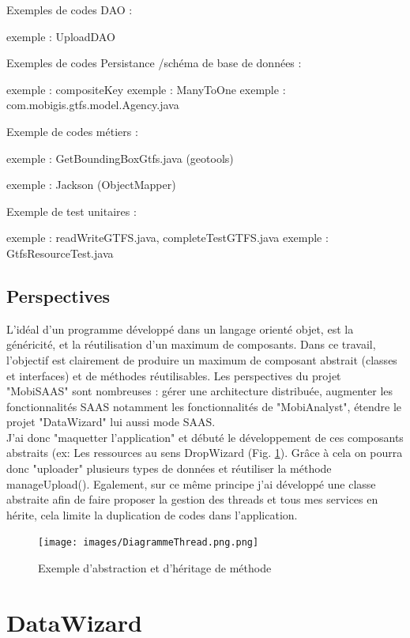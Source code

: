 \begin{itemize}
Exemples de codes DAO :

exemple : UploadDAO

Exemples de codes Persistance /schéma de base de données : 

exemple : compositeKey
exemple : ManyToOne
exemple : com.mobigis.gtfs.model.Agency.java


Exemple de codes métiers :

exemple : GetBoundingBoxGtfs.java (geotools)

exemple : Jackson (ObjectMapper)


Exemple de test unitaires :

exemple : readWriteGTFS.java, completeTestGTFS.java
exemple : GtfsResourceTest.java

\subsection{Perspectives}

L'idéal d'un programme développé dans un langage orienté objet, est la généricité, et la réutilisation d'un maximum de composants. Dans ce travail, l'objectif est clairement de produire un maximum de composant abstrait (classes et interfaces) et de méthodes réutilisables. Les perspectives du projet "MobiSAAS" sont nombreuses : gérer une architecture distribuée, augmenter les fonctionnalités SAAS notamment les fonctionnalités de "MobiAnalyst", étendre le projet "DataWizard" lui aussi mode SAAS.\\

J'ai donc "maquetter l'application" et débuté le développement de ces composants abstraits (ex: Les ressources au sens DropWizard (Fig. \ref{UML1}). Grâce à cela on pourra donc "uploader" plusieurs types de données et réutiliser la méthode manageUpload(). Egalement, sur ce même principe j'ai développé une classe abstraite afin de faire proposer la gestion des threads et tous mes services en hérite, cela limite la duplication de codes dans l'application.\\
\begin{figure}[!h]
\centering
\texttt{[image: images/DiagrammeThread.png.png]}
\caption{\label{UML1}Exemple d'abstraction et d'héritage de méthode}
\end{figure} 

\pagebreak

\section{DataWizard}\label{DataWizard}


\end{itemize}
